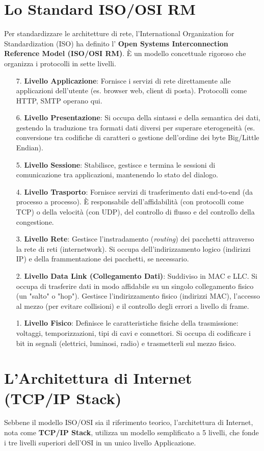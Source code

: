 \section{Lo Standard ISO/OSI RM}
Per standardizzare le architetture di rete, l'International Organization for Standardization (ISO) ha definito l' \textbf{Open Systems Interconnection Reference Model (ISO/OSI RM)}. È un modello concettuale rigoroso che organizza i protocolli in sette livelli.
\begin{enumerate}
    \item[7.] \textbf{Livello Applicazione}: Fornisce i servizi di rete direttamente alle applicazioni dell'utente (es. browser web, client di posta). Protocolli come HTTP, SMTP operano qui.
    \item[6.] \textbf{Livello Presentazione}: Si occupa della sintassi e della semantica dei dati, gestendo la traduzione tra formati dati diversi per superare eterogeneità (es. conversione tra codifiche di caratteri o gestione dell'ordine dei byte Big/Little Endian).
    \item[5.] \textbf{Livello Sessione}: Stabilisce, gestisce e termina le sessioni di comunicazione tra applicazioni, mantenendo lo stato del dialogo.
    \item[4.] \textbf{Livello Trasporto}: Fornisce servizi di trasferimento dati end-to-end (da processo a processo). È responsabile dell'affidabilità (con protocolli come TCP) o della velocità (con UDP), del controllo di flusso e del controllo della congestione.
    \item[3.] \textbf{Livello Rete}: Gestisce l'instradamento (\textit{routing}) dei pacchetti attraverso la rete di reti (internetwork). Si occupa dell'indirizzamento logico (indirizzi IP) e della frammentazione dei pacchetti, se necessario.
    \item[2.] \textbf{Livello Data Link (Collegamento Dati)}: Suddiviso in MAC e LLC. Si occupa di trasferire dati in modo affidabile su un singolo collegamento fisico (un "salto" o "hop"). Gestisce l'indirizzamento fisico (indirizzi MAC), l'accesso al mezzo (per evitare collisioni) e il controllo degli errori a livello di frame.
    \item[1.] \textbf{Livello Fisico}: Definisce le caratteristiche fisiche della trasmissione: voltaggi, temporizzazioni, tipi di cavi e connettori. Si occupa di codificare i bit in segnali (elettrici, luminosi, radio) e trasmetterli sul mezzo fisico.
\end{enumerate}

\section{L'Architettura di Internet (TCP/IP Stack)}
Sebbene il modello ISO/OSI sia il riferimento teorico, l'architettura di Internet, nota come \textbf{TCP/IP Stack}, utilizza un modello semplificato a 5 livelli, che fonde i tre livelli superiori dell'OSI in un unico livello Applicazione.

